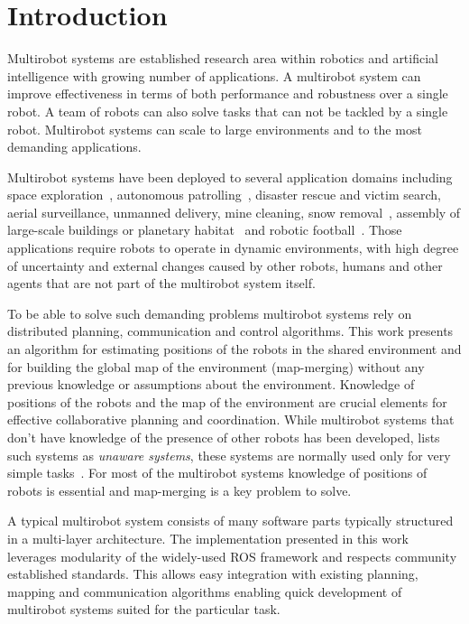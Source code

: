 \chapter*{Introduction}

Multirobot systems are established research area within robotics and artificial intelligence with growing number of applications. A multirobot system can improve effectiveness in terms of both performance and robustness over a single robot. A team of robots can also solve tasks that can not be tackled by a single robot. Multirobot systems can scale to large environments and to the most demanding applications.

Multirobot systems have been deployed to several application domains including space exploration~\citep{goldberg2002distributedspace,huntsberger2003campout}, autonomous patrolling~\citep{parker2003parolling100}, disaster rescue and victim search, aerial surveillance, unmanned delivery, mine cleaning, snow removal~\citep{choset2001coverage}, assembly of large-scale buildings or planetary habitat~\citep{goldberg2002distributedspace} and robotic football~\citep{asada1999robocup}. Those applications require robots to operate in  dynamic environments, with high degree of uncertainty and external changes caused by other robots, humans and other agents that are not part of the multirobot system itself.

To be able to solve such demanding problems multirobot systems rely on distributed planning, communication and control algorithms. This work presents an algorithm for estimating positions of the robots in the shared environment and for building the global map of the environment (map-merging) without any previous knowledge or assumptions about the environment. Knowledge of positions of the robots and the map of the environment are crucial elements for effective collaborative planning and coordination. While multirobot systems that don't have knowledge of the presence of other robots has been developed, \citet{farinelli2004multirobot} lists such systems as \textit{unaware systems}, these systems are normally used only for very simple tasks~\citep{farinelli2004multirobot}. For most of the multirobot systems knowledge of positions of robots is essential and map-merging is a key problem to solve.

A typical multirobot system consists of many software parts typically structured in a multi-layer architecture. The implementation presented in this work leverages modularity of the widely-used \gls{ROS} framework and respects community established standards. This allows easy integration with existing planning, mapping and communication algorithms enabling quick development of multirobot systems suited for the particular task.

